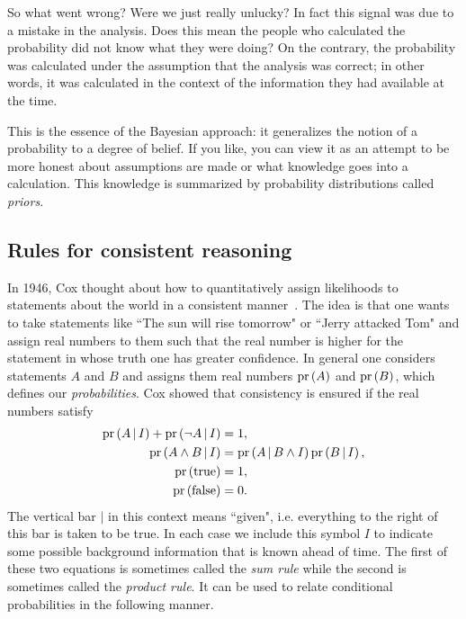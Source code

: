 So what went wrong? Were we just really unlucky? In fact this signal was due to
a mistake in the analysis. Does this mean the people who calculated the
probability did not know what they were doing? On the contrary, the probability
was calculated under the assumption that the analysis was correct; in other
words, it was calculated in the context of the information they had available at
the time.

This is the essence of the Bayesian approach: it generalizes the notion of a 
probability to a degree of belief. If you like, you can view it as an attempt to
be more honest about assumptions are made or what knowledge goes into a
calculation. This knowledge is summarized by probability distributions called
{\it priors}.

\subsection{Rules for consistent reasoning}\label{sec:consistentReasoning}

In 1946, Cox thought about how to quantitatively assign likelihoods to
statements about the world in a consistent manner~\cite{cox_probability_1946}. 
The idea is that one wants to
take statements like ``The sun will rise tomorrow" or ``Jerry attacked Tom" and
assign real numbers to them such that the real number is higher for the
statement in whose truth one has greater confidence.
In general one considers statements $A$ and $B$ and assigns them
real numbers $\operatorname{pr}\left(A\right)$ and $\operatorname{pr}\left(B\right)$, which defines our 
{\it probabilities}. 
Cox showed that consistency is ensured
if the real numbers satisfy
\begin{equation}\begin{aligned}\label{eq:probabilityAxioms}
\operatorname{pr}\left(A\,|\, I\right)+\operatorname{pr}\left(\neg A\,|\, I\right)&=1,\\
\operatorname{pr}\left(A\wedge B\,|\, I\right)&=\operatorname{pr}\left(A\,|\, B\wedge I\right)\operatorname{pr}\left(B\,|\, I\right),\\
\operatorname{pr}\left(\text{true}\right)&=1,\\
\operatorname{pr}\left(\text{false}\right)&=0.
\end{aligned}\end{equation}
The vertical bar $|$ in this context means ``given", i.e. everything to the
right of this bar is taken to be true. In each case we include this symbol $I$
to indicate some possible background information that is known ahead of time.
The first of these two equations is sometimes called the {\it sum
rule} while the second is sometimes called the {\it product
rule}. It can be used to relate conditional probabilities
in the following manner.

